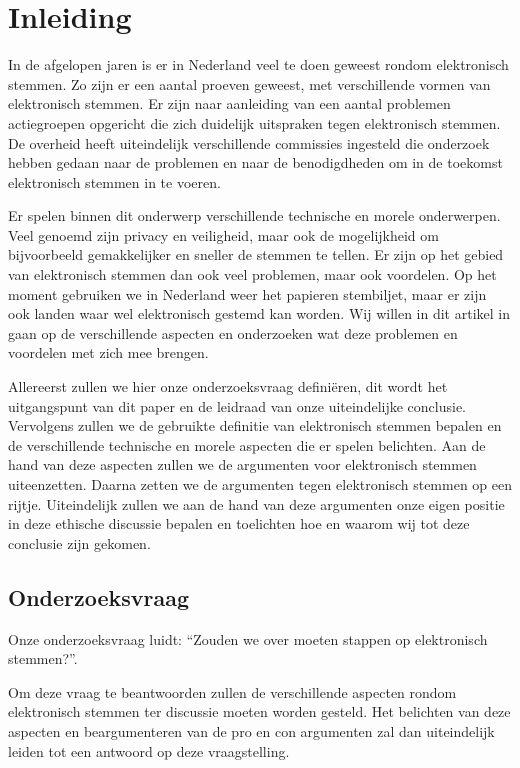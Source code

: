 \documentclass[a4paper]{article}
\begin{document}
\thispagestyle{empty}
\newpage

\section{Inleiding}

In de afgelopen jaren is er in Nederland veel te doen geweest rondom elektronisch stemmen.
Zo zijn er een aantal proeven geweest, met verschillende vormen van elektronisch stemmen.
Er zijn naar aanleiding van een aantal problemen actiegroepen opgericht die zich duidelijk uitspraken tegen elektronisch stemmen.
De overheid heeft uiteindelijk verschillende commissies ingesteld die onderzoek hebben gedaan naar de problemen en naar de benodigdheden om in de toekomst elektronisch stemmen in te voeren.

Er spelen binnen dit onderwerp verschillende technische en morele onderwerpen.
Veel genoemd zijn privacy en veiligheid, maar ook de mogelijkheid om bijvoorbeeld gemakkelijker en sneller de stemmen te tellen.
Er zijn op het gebied van elektronisch stemmen dan ook veel problemen, maar ook voordelen.
Op het moment gebruiken we in Nederland weer het papieren stembiljet, maar er zijn ook landen waar wel elektronisch gestemd kan worden.
Wij willen in dit artikel in gaan op de verschillende aspecten en onderzoeken wat deze problemen en voordelen met zich mee brengen.

Allereerst zullen we hier onze onderzoeksvraag definiëren, dit wordt het uitgangspunt van dit paper en de leidraad van onze uiteindelijke conclusie.
Vervolgens zullen we de gebruikte definitie van elektronisch stemmen bepalen en de verschillende technische en morele aspecten die er spelen belichten.
Aan de hand van deze aspecten zullen we de argumenten voor elektronisch stemmen uiteenzetten.
Daarna zetten we de argumenten tegen elektronisch stemmen op een rijtje.
Uiteindelijk zullen we aan de hand van deze argumenten onze eigen positie in deze ethische discussie bepalen en toelichten hoe en waarom wij tot deze conclusie zijn gekomen.

\subsection{Onderzoeksvraag}

Onze onderzoeksvraag luidt: ``Zouden we over moeten stappen op elektronisch stemmen?''.

Om deze vraag te beantwoorden zullen de verschillende aspecten rondom elektronisch stemmen ter discussie moeten worden gesteld.
Het belichten van deze aspecten en beargumenteren van de pro en con argumenten zal dan uiteindelijk leiden tot een antwoord op deze vraagstelling.
\end{document}
